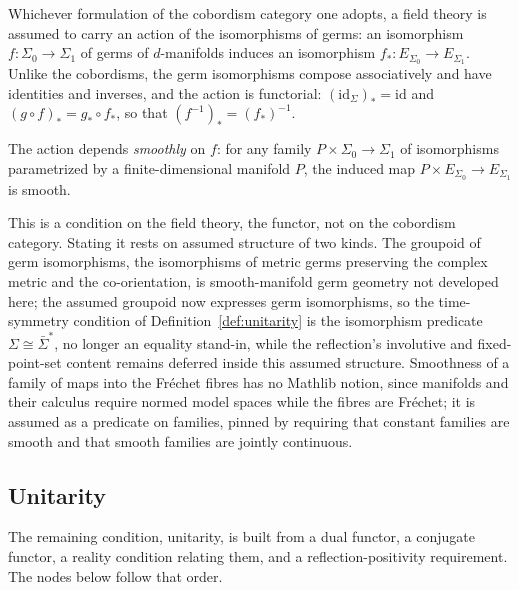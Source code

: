 \begin{definition}
  \label{def:isomorphism-action}
  \leanok
  Whichever formulation of the cobordism category one adopts, a field theory is
  assumed to carry an action of the isomorphisms of germs: an isomorphism
  $f \colon \Sigma_0 \to \Sigma_1$ of germs of $d$-manifolds induces an
  isomorphism $f_* \colon E_{\Sigma_0} \to E_{\Sigma_1}$. Unlike the cobordisms,
  the germ isomorphisms compose associatively and have identities and inverses,
  and the action is functorial: $(\mathrm{id}_{\Sigma})_* = \mathrm{id}$ and
  $(g \circ f)_* = g_* \circ f_*$, so that $(f^{-1})_* = (f_*)^{-1}$.

  The action depends \emph{smoothly} on $f$: for any family
  $P \times \Sigma_0 \to \Sigma_1$ of isomorphisms parametrized by a
  finite-dimensional manifold $P$, the induced map
  $P \times E_{\Sigma_0} \to E_{\Sigma_1}$ is smooth.

  This is a condition on the field theory, the functor, not on the cobordism
  category. Stating it rests on assumed structure of two kinds. The groupoid of
  germ isomorphisms, the isomorphisms of metric germs preserving the complex
  metric and the co-orientation, is smooth-manifold germ geometry not developed
  here; the assumed groupoid now expresses germ isomorphisms, so the
  time-symmetry condition of Definition~\ref{def:unitarity} is the isomorphism
  predicate $\Sigma \cong \bar\Sigma^*$, no longer an equality stand-in, while
  the reflection's involutive and fixed-point-set content remains deferred
  inside this assumed structure. Smoothness of a family of
  maps into the Fréchet fibres has no Mathlib notion, since manifolds and their
  calculus require normed model spaces while the fibres are Fréchet; it is
  assumed as a predicate on families, pinned by requiring that constant families
  are smooth and that smooth families are jointly continuous.
\end{definition}

\subsection{Unitarity}

The remaining condition, unitarity, is built from a dual functor, a conjugate
functor, a reality condition relating them, and a reflection-positivity
requirement. The nodes below follow that order.

